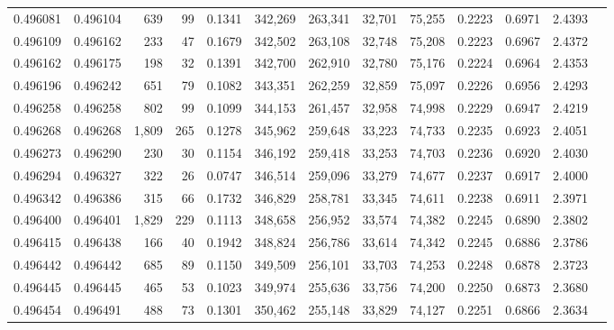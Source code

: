 \begin{tabular}{rrrrrrrrrrrrr}
0.496081 & 0.496104 &   639 &    99 &                                     0.1341 & 342,269 & 263,341 &  32,701 &  75,255 & 0.2223 & 0.6971 & 2.4393 \\
0.496109 & 0.496162 &   233 &    47 &                                     0.1679 & 342,502 & 263,108 &  32,748 &  75,208 & 0.2223 & 0.6967 & 2.4372 \\
0.496162 & 0.496175 &   198 &    32 &                                     0.1391 & 342,700 & 262,910 &  32,780 &  75,176 & 0.2224 & 0.6964 & 2.4353 \\
0.496196 & 0.496242 &   651 &    79 &                                     0.1082 & 343,351 & 262,259 &  32,859 &  75,097 & 0.2226 & 0.6956 & 2.4293 \\
0.496258 & 0.496258 &   802 &    99 &                                     0.1099 & 344,153 & 261,457 &  32,958 &  74,998 & 0.2229 & 0.6947 & 2.4219 \\
0.496268 & 0.496268 & 1,809 &   265 &                                     0.1278 & 345,962 & 259,648 &  33,223 &  74,733 & 0.2235 & 0.6923 & 2.4051 \\
0.496273 & 0.496290 &   230 &    30 &                                     0.1154 & 346,192 & 259,418 &  33,253 &  74,703 & 0.2236 & 0.6920 & 2.4030 \\
0.496294 & 0.496327 &   322 &    26 &                                     0.0747 & 346,514 & 259,096 &  33,279 &  74,677 & 0.2237 & 0.6917 & 2.4000 \\
0.496342 & 0.496386 &   315 &    66 &                                     0.1732 & 346,829 & 258,781 &  33,345 &  74,611 & 0.2238 & 0.6911 & 2.3971 \\
0.496400 & 0.496401 & 1,829 &   229 &                                     0.1113 & 348,658 & 256,952 &  33,574 &  74,382 & 0.2245 & 0.6890 & 2.3802 \\
0.496415 & 0.496438 &   166 &    40 &                                     0.1942 & 348,824 & 256,786 &  33,614 &  74,342 & 0.2245 & 0.6886 & 2.3786 \\
0.496442 & 0.496442 &   685 &    89 &                                     0.1150 & 349,509 & 256,101 &  33,703 &  74,253 & 0.2248 & 0.6878 & 2.3723 \\
0.496445 & 0.496445 &   465 &    53 &                                     0.1023 & 349,974 & 255,636 &  33,756 &  74,200 & 0.2250 & 0.6873 & 2.3680 \\
0.496454 & 0.496491 &   488 &    73 &                                     0.1301 & 350,462 & 255,148 &  33,829 &  74,127 & 0.2251 & 0.6866 & 2.3634 \\

\end{tabular}
